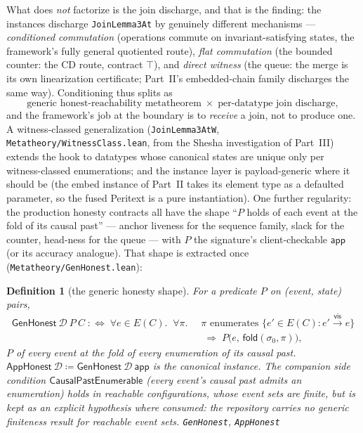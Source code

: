 \documentclass[11pt]{article}
\newtheorem{definition}[theorem]{Definition}
\newcommand{\vis}{\xrightarrow{\mathsf{vis}}}
\newcommand{\Sinit}{\sigma_0}
\newcommand{\lean}[1]{\texttt{#1}}
\newcommand{\M}[1]{\mathcal{#1}}
\newcommand{\fold}{\mathsf{fold}}
\newcommand{\app}{\mathsf{app}}
\begin{document}
What does \emph{not} factorize is the join discharge, and that is the
finding: the instances discharge \lean{JoinLemma3At} by
genuinely different mechanisms --- \emph{conditioned commutation}
(operations commute on invariant-satisfying states, the framework's
fully general quotiented route), \emph{flat
commutation} (the bounded counter: the CD route, contract $\top$), and
\emph{direct witness} (the queue: the merge is its own linearization
certificate; Part~II's embedded-chain family discharges the same way).
Conditioning thus splits as
\[
  \text{generic honest-reachability metatheorem}
  \;\times\;
  \text{per-datatype join discharge},
\]
and the framework's job at the boundary is to \emph{receive} a join, not
to produce one. A witness-classed generalization
(\lean{JoinLemma3AtW}, \lean{Metatheory/WitnessClass.lean}, from the
Shesha investigation of Part~III) extends the hook to datatypes whose
canonical states are unique only per witness-classed enumerations; and
the instance layer is payload-generic where it should be (the embed
instance of Part~II takes its element type as a defaulted parameter, so
the fused Peritext is a pure instantiation). One further regularity: the
production honesty contracts all have the shape
``$P$ holds of each event at the fold of
its causal past'' --- anchor liveness for the sequence family, slack for
the counter, head-ness for the queue --- with $P$ the
signature's client-checkable $\app$ (or its accuracy analogue). That
shape is extracted once (\lean{Metatheory/GenHonest.lean}):

\begin{definition}[the generic honesty shape]
\label{def:genhonest}
For a predicate $P$ on (event, state) pairs,
\[
\begin{aligned}
  \mathsf{GenHonest}\ \M{D}\ P\ C \;:\Longleftrightarrow\;
  \forall e \in E(C).\;\; \forall \pi.\;\;
  &\pi \text{ enumerates } \{e' \in E(C) : e' \vis e\}\\
  &\;\Longrightarrow\; P\bigl(e,\, \fold(\Sinit, \pi)\bigr) ,
\end{aligned}
\]
$P$ of every event at the fold of \emph{every} enumeration of its causal
past. $\mathsf{AppHonest}\ \M{D} \coloneqq
\mathsf{GenHonest}\ \M{D}\ \app$ is the canonical instance. The
companion side condition $\mathsf{CausalPastEnumerable}$ (every event's
causal past admits an enumeration) holds in reachable configurations,
whose event sets are finite, but is kept as an explicit hypothesis where
consumed: the repository carries no generic finiteness result for
reachable event sets.
\hfill\lean{GenHonest}, \lean{AppHonest}
\end{definition}
\end{document}
